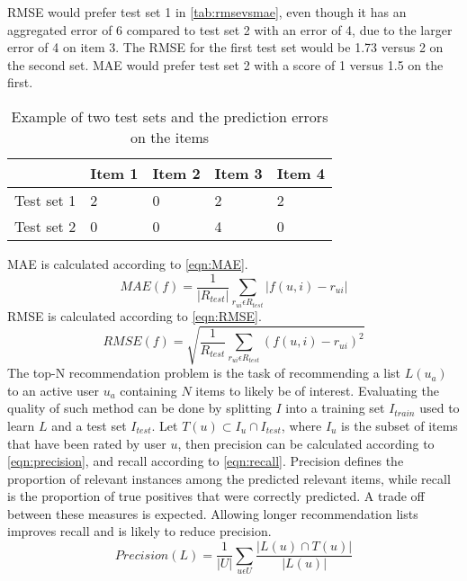 RMSE would prefer test set 1 in \autoref{tab:rmsevsmae}, even though it has an aggregated error of 6 compared to test set 2 with an error of 4, due to the larger error of 4 on item 3.
The RMSE for the first test set would be 1.73 versus 2 on the second set.
MAE would prefer test set 2 with a score of 1 versus 1.5 on the first.
\begin{table}[]
    \begin{tabular}{|l|l|l|l|l|}
    \hline
               & Item 1 & Item 2 & Item 3 & Item 4 \\ \hline
    Test set 1 & 2      & 0      & 2      & 2      \\ \hline
    Test set 2 & 0      & 0      & 4      & 0      \\ \hline
    \end{tabular}
    \caption{Example of two test sets and the prediction errors on the items}
    \label{tab:rmsevsmae}
\end{table}
MAE is calculated according to \autoref{eqn:MAE}.
\begin{equation}
    \label{eqn:MAE}
    MAE(f) = \frac{1}{|R_{test}|} \sum\limits_{r_{ui} \epsilon R_{test}} |f(u,i)-r_{ui}|
\end{equation}
RMSE is calculated according to \autoref{eqn:RMSE}.
\begin{equation}
    \label{eqn:RMSE}
    RMSE(f) = \sqrt{\frac{1}{R_{test}} \sum\limits_{r_{ui} \epsilon R_{test}} (f(u, i) - r_{ui})^2}
\end{equation}
The top-N recommendation problem is the task of recommending a list $L(u_a)$ to an active user $u_a$ containing $N$ items to likely be of interest.
Evaluating the quality of such method can be done by splitting $I$ into a training set $I_{train}$ used to learn $L$ and a test set $I_{test}$.
Let $T(u) \subset I_u \cap I_{test}$, where $I_u$ is the subset of items that have been rated by user $u$, then precision can be calculated according to \autoref{eqn:precision}, and recall according to \autoref{eqn:recall}.
Precision defines the proportion of relevant instances among the predicted relevant items, while recall is the proportion of true positives that were correctly predicted.
A trade off between these measures is expected.
Allowing longer recommendation lists improves recall and is likely to reduce precision\cite{RecommenderHandbook2015}.
\begin{equation}
    \label{eqn:precision}
    Precision(L) = \frac{1}{|U|} \sum\limits_{u \epsilon U}\frac{|L(u) \cap T(u)|}{|L(u)|}
\end{equation}
